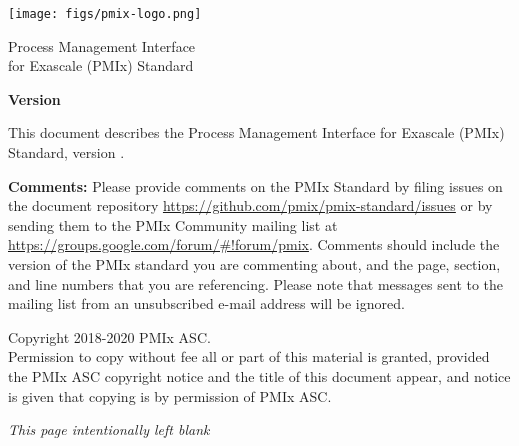 
  \begin{titlepage}
    \begin{flushleft}
     \hspace{-6em} \texttt{[image: figs/pmix-logo.png]}
    \end{flushleft}

    \begin{adjustwidth}{-0.75in}{0in}
    \begin{center}
      \Huge
      \textsf{Process Management Interface\\for Exascale (PMIx) Standard}

      \vspace{1.0in}
	  \huge
      \textbf{Version \VER{}}

      \vspace{0.15in}
	  \Large
      \textbf{\VERDATE}

    \end{center}
    \end{adjustwidth}

    \vspace{1.2in}

\par
This document describes the Process Management Interface for Exascale (PMIx) Standard, version \VER{}.

\par
\textbf{Comments:}
Please provide comments on the PMIx Standard by filing issues on the document repository \url{https://github.com/pmix/pmix-standard/issues} or by sending them to the PMIx Community mailing list at \url{https://groups.google.com/forum/#!forum/pmix}.
Comments should include the version of the PMIx standard you are commenting about, and the page, section, and line numbers that you are referencing.
Please note that messages sent to the mailing list from an unsubscribed e-mail address will be ignored.

\vfill

\begin{adjustwidth}{0pt}{1em}\setlength{\parskip}{0.25\baselineskip}%
Copyright \textsuperscript{\textcopyright} 2018-2020 PMIx \acf{ASC}.\\
Permission to copy without fee all or part of this material is granted,
provided the PMIx \ac{ASC} copyright notice and
the title of this document appear, and notice is given that copying is by
permission of PMIx \ac{ASC}.
\end{adjustwidth}

  \end{titlepage}

\clearpage
\thispagestyle{empty}
\phantom{a}
\begin{center}
\emph{This page intentionally left blank}
\end{center}

\vfill

